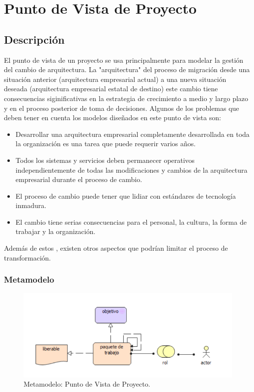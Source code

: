\section{Punto de Vista de Proyecto}
\subsection{Descripción}
El punto de vista de un proyecto se usa principalmente para modelar la gestión del cambio de arquitectura. La "arquitectura" del proceso de migración desde una situación anterior (arquitectura empresarial actual) a una nueva situación deseada (arquitectura empresarial estatal de destino)  este cambio tiene consecuencias siginificativas en la estrategia de crecimiento a medio y largo plazo y en el proceso posterior de toma de decisiones. 
Algunos de los problemas que deben tener en cuenta los modelos diseñados en este punto de vista son:
\begin{itemize}
	\item Desarrollar una arquitectura empresarial completamente desarrollada en toda la organización es una tarea que puede requerir varios años.
	\item Todos los sistemas y servicios deben permanecer operativos independientemente de todas las modificaciones y cambios de la arquitectura empresarial durante el proceso de cambio.
	\item El proceso de cambio puede tener que lidiar con estándares de tecnología inmadura.
	\item El cambio tiene serias consecuencias para el personal, la cultura, la forma de trabajar y la organización.
\end{itemize}
Además de estos , existen otros aspectos que podrían limitar el proceso de transformación. 

\subsubsection{Metamodelo}
\begin{figure}[H]
	\centering
	\includegraphics[width=1.0\textwidth]{imagenes/Metamodelos/Migracion/meta_Proyecto.pdf}
	\caption{Metamodelo: Punto de Vista de Proyecto.}
	\label{fig:gap_analysis}
\end{figure}

